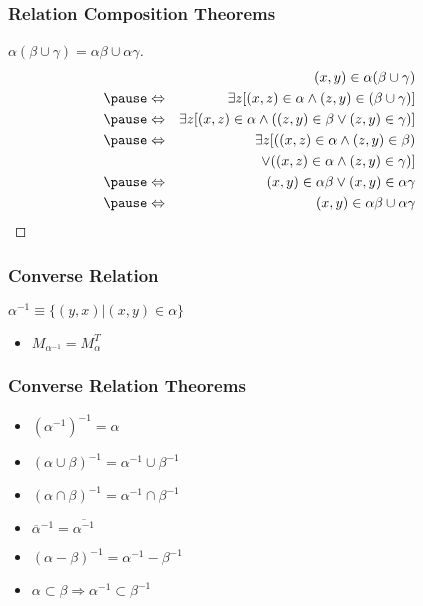 \documentclass[dvipsnames]{beamer}
\begin{document}
\begin{frame}
  \frametitle{Relation Composition Theorems}

  \begin{proof}[$\alpha (\beta \cup \gamma) = \alpha \beta \cup \alpha \gamma$]
    \begin{eqnarray*}
      &                 & (x,y) \in \alpha (\beta \cup \gamma)\\\pause
      & \Leftrightarrow & \exists z [(x,z) \in \alpha
                              \wedge (z,y) \in (\beta \cup \gamma)]\\\pause
      & \Leftrightarrow & \exists z [(x,z) \in \alpha
                             \wedge ((z,y) \in \beta
                                \vee (z,y) \in \gamma)]\\\pause
      & \Leftrightarrow & \exists z [((x,z) \in \alpha \wedge (z,y) \in \beta)\\
      &                 &     ~~\vee ((x,z) \in \alpha \wedge (z,y) \in \gamma)]\\\pause
      & \Leftrightarrow & (x,y) \in \alpha \beta \vee (x,y) \in \alpha \gamma\\\pause
      & \Leftrightarrow & (x,y) \in \alpha \beta \cup \alpha \gamma
    \end{eqnarray*}
  \end{proof}
\end{frame}

\begin{frame}
  \frametitle{Converse Relation}

  \begin{definition}
    $\alpha^{-1} \equiv \{(y,x) | (x,y) \in \alpha \}$
  \end{definition}

  \begin{itemize}
    \item $M_{\alpha^{-1}} = M_{\alpha}^T$
  \end{itemize}
\end{frame}

\begin{frame}
  \frametitle{Converse Relation Theorems}

  \begin{itemize}
    \item $(\alpha^{-1})^{-1} = \alpha$

    \pause
    \item $(\alpha \cup \beta)^{-1} = \alpha^{-1} \cup \beta^{-1}$

    \pause
    \item $(\alpha \cap \beta)^{-1} = \alpha^{-1} \cap \beta^{-1}$

    \pause
    \item $\overline{\alpha}^{-1} = \overline{\alpha^{-1}}$

    \pause
    \item $(\alpha - \beta)^{-1} = \alpha^{-1} - \beta^{-1}$

    \pause
    \item $\alpha \subset \beta \Rightarrow \alpha^{-1} \subset \beta^{-1}$
  \end{itemize}
\end{frame}
\end{document}
